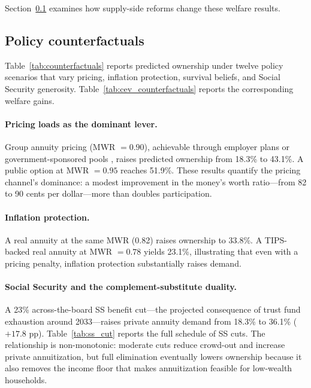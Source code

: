 \documentclass[12pt]{article}
\begin{document}
Section~\ref{sec:counterfactuals} examines how supply-side reforms change these welfare results.


\subsection{Policy counterfactuals}
\label{sec:counterfactuals}

Table~\ref{tab:counterfactuals} reports predicted ownership under twelve policy scenarios that vary pricing, inflation protection, survival beliefs, and Social Security generosity. Table~\ref{tab:cev_counterfactuals} reports the corresponding welfare gains.



\paragraph{Pricing loads as the dominant lever.} Group annuity pricing (MWR $= 0.90$), achievable through employer plans or government-sponsored pools \citep{james2006}, raises predicted ownership from 18.3\% to 43.1\%. A public option at MWR $= 0.95$ reaches 51.9\%. These results quantify the pricing channel's dominance: a modest improvement in the money's worth ratio---from 82 to 90 cents per dollar---more than doubles participation.

\paragraph{Inflation protection.} A real annuity at the same MWR (0.82) raises ownership to 33.8\%. A TIPS-backed real annuity at MWR $= 0.78$ yields 23.1\%, illustrating that even with a pricing penalty, inflation protection substantially raises demand.

\paragraph{Social Security and the complement-substitute duality.} A 23\% across-the-board SS benefit cut---the projected consequence of trust fund exhaustion around 2033---raises private annuity demand from 18.3\% to 36.1\% ($+17.8$ pp). Table~\ref{tab:ss_cut} reports the full schedule of SS cuts. The relationship is non-monotonic: moderate cuts reduce crowd-out and increase private annuitization, but full elimination eventually lowers ownership because it also removes the income floor that makes annuitization feasible for low-wealth households.
\end{document}
